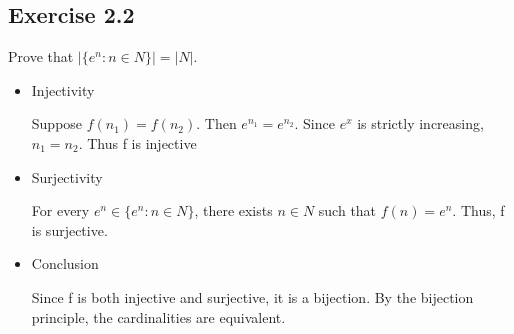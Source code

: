 \documentclass[12pt]{article}
\begin{document}
		\subsection*{Exercise 2.2}
			Prove that $|\{e^n: n \in N\}| = |N|$.
			
			\begin{itemize}
				\item Injectivity
				
				Suppose $f(n_1) = f(n_2)$. Then $e^{n_1} = e^{n_2}$. Since $e^x$ is strictly increasing, $n_1 = n_2$. Thus f is injective
				
				\item Surjectivity
				
				For every $e^n \in \{e^n: n \in N\}$, there exists $n \in N$ such that $f(n) = e^n$. Thus, f is surjective.
				
				\item Conclusion
				
				Since f is both injective and surjective, it is a bijection. By the bijection principle, the cardinalities are equivalent.
			\end{itemize}
\end{document}
